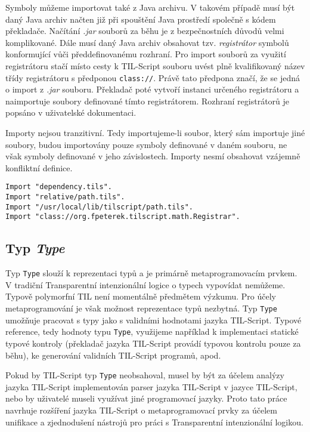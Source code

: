 Symboly můžeme importovat také z Java archivu. V takovém případě musí být daný Java archiv načten
již při spouštění Java prostředí společně s kódem překladače. Načítání \textit{.jar} souborů
za běhu je z bezpečnostních důvodů velmi komplikované. Dále musí daný Java archiv obsahovat tzv.
\textit{registrátor} symbolů konformující vůči předdefinovanému rozhraní. Pro import souborů
za využití registrátoru stačí místo cesty k TIL-Script souboru uvést plně kvalifikovaný název
třídy registrátoru s předponou \lstinline{class://}. Právě tato předpona značí, že se jedná o
import z \textit{.jar} souboru. Překladač poté vytvoří instanci určeného registrátoru a naimportuje
soubory definované tímto registrátorem. Rozhraní registrátorů je popsáno v uživatelské dokumentaci.

Importy nejsou tranzitivní. Tedy importujeme-li soubor, který sám importuje jiné soubory, budou
importovány pouze symboly definované v daném souboru, ne však symboly definované v jeho
závislostech. Importy nesmí obsahovat vzájemně konfliktní definice.

\begin{lstlisting}[caption={Příklad využití výrazů Import}]
Import "dependency.tils".
Import "relative/path.tils".
Import "/usr/local/lib/tilscript/path.tils".
Import "class://org.fpeterek.tilscript.math.Registrar".
\end{lstlisting}

\subsection{Typ \textit{Type}}

Typ \lstinline{Type} slouží k reprezentaci typů a je primárně metaprogramovacím prvkem. V tradiční
Transparentní intenzionální logice o typech vypovídat nemůžeme. Typově polymorfní TIL není
momentálně předmětem výzkumu. Pro účely metaprogramování je však možnost reprezentace typů
nezbytná. Typ \lstinline{Type} umožňuje pracovat s typy jako s validními hodnotami jazyka
TIL-Script. Typové reference, tedy hodnoty typu \lstinline{Type}, využijeme například
k implementaci statické typové kontroly (překladač jazyka TIL-Script provádí typovou kontrolu pouze
za běhu), ke generování validních TIL-Script programů, apod.

Pokud by TIL-Script typ \lstinline{Type} neobsahoval, musel by být za účelem analýzy jazyka
TIL-Script implementován parser jazyka TIL-Script v jazyce TIL-Script, nebo by uživatelé museli
využívat jiné programovací jazyky. Proto tato práce navrhuje rozšíření jazyka TIL-Script
o metaprogramovací prvky za účelem unifikace a zjednodušení nástrojů pro práci s Transparentní
intenzionální logikou.

